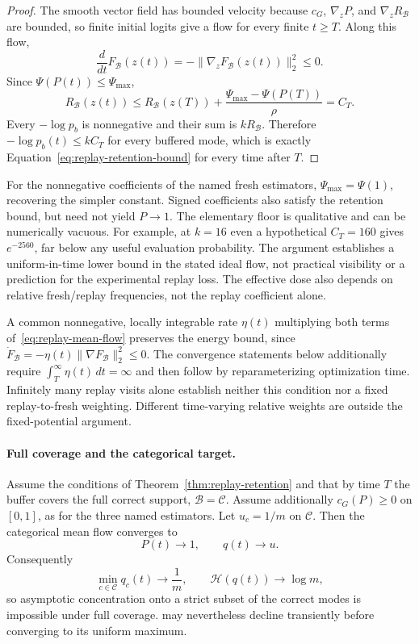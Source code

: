 \begin{proof}
\enforcehalffinalproseline
The smooth vector field has bounded velocity because $c_G$,
$\nabla_zP$, and $\nabla_zR_{\mathcal B}$ are bounded, so finite initial
logits give a flow for every finite $t\ge T$. Along this flow,
\[
  \frac{d}{dt}F_{\mathcal B}(z(t))
  =-\lVert\nabla_zF_{\mathcal B}(z(t))\rVert_2^2\le0.
\]
Since $\Psi(P(t))\le\Psi_{\max}$,
\[
  R_{\mathcal B}(z(t))
  \le R_{\mathcal B}(z(T))
     +\frac{\Psi_{\max}-\Psi(P(T))}{\rho}
  =C_T.
\]
Every $-\log p_b$ is nonnegative and their sum is
$kR_{\mathcal B}$. Therefore
$-\log p_b(t)\le kC_T$ for every buffered mode, which is exactly
Equation~\eqref{eq:replay-retention-bound} for every time after $T$.
\end{proof}

For the nonnegative coefficients of the named fresh estimators,
$\Psi_{\max}=\Psi(1)$, recovering the simpler constant. Signed coefficients
also satisfy the retention bound, but need not yield $P\to1$.
The elementary floor is qualitative and can be numerically vacuous. For example, at
$k=16$ even a hypothetical $C_T=160$ gives $e^{-2560}$, far below any useful
evaluation probability. The argument establishes a uniform-in-time lower
bound in the stated ideal flow, not practical visibility or a prediction for
the experimental replay loss. The effective dose also depends on relative
fresh/replay frequencies, not the replay coefficient alone.

A common nonnegative, locally integrable rate $\eta(t)$ multiplying both
terms of~\eqref{eq:replay-mean-flow} preserves the energy bound, since
$\dot F_{\mathcal B}=-\eta(t)\|\nabla F_{\mathcal B}\|_2^2\le0$.
The convergence statements below additionally require
$\int_T^\infty\eta(t)\,dt=\infty$ and then follow by reparameterizing
optimization time. Infinitely many replay visits alone establish neither
this condition nor a fixed replay-to-fresh weighting. Different time-varying
relative weights are outside the fixed-potential argument.

\paragraph{Full coverage and the categorical target.}
\begin{corollary}
\enforcehalffinalproseline
\label{cor:replay-no-collapse}
Assume the conditions of Theorem~\ref{thm:replay-retention} and that by time
$T$ the buffer covers the full correct support, $\mathcal B=\mathcal C$.
Assume additionally $c_G(P)\ge0$ on $[0,1]$, as for the three named
estimators. Let
$u_c=1/m$ on $\mathcal C$. Then the categorical mean flow converges to
\[
  P(t)\longrightarrow1,
  \qquad q(t)\longrightarrow u.
\]
Consequently
\[
  \min_{c\in\mathcal C}q_c(t)\longrightarrow\frac1m,
  \qquad
  \mathcal H(q(t))\longrightarrow\log m,
\]
so asymptotic concentration onto a strict subset of the correct modes is
impossible under full coverage. \pmd{} may nevertheless decline transiently
before converging to its uniform maximum.
\end{corollary}

